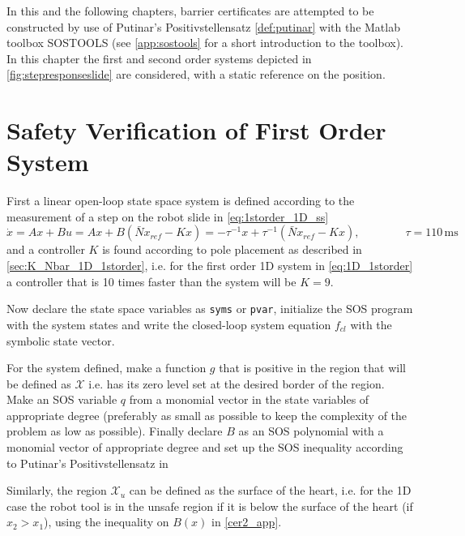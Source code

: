 In this and the following chapters, barrier certificates are attempted to be constructed by use of Putinar's Positivstellensatz \autoref{def:putinar} with the Matlab toolbox SOSTOOLS (see \autoref{app:sostools} for a short introduction to the toolbox). In this chapter the first and second order systems depicted in \autoref{fig:stepresponseslide} are considered, with a static reference on the position.




\section{Safety Verification of First Order System}
First a linear open-loop state space system is defined according to the measurement of a step on the robot slide in \autoref{eq:1storder_1D_ss}
\begin{equation}
\dot{x} = Ax+Bu = Ax+B(\bar{N}x_{ref}-Kx) = %
-\tau^{-1}x+\tau^{-1}(\bar{N}x_{ref}-Kx), \qquad\qquad \tau=110\,\text{ms}
\label{eq:1D_1storder}
\end{equation} 
and a controller $K$ is found according to pole placement as described in \autoref{sec:K_Nbar_1D_1storder}, i.e. for the first order 1D system in \autoref{eq:1D_1storder} a controller that is 10 times faster than the system will be $K=9$.

Now declare the state space variables as \verb|syms| or \verb|pvar|, initialize the SOS program with the system states and write the closed-loop system equation $f_{cl}$ with the symbolic state vector.

For the system defined, make a function $g$ that is positive in the region that will be defined as $\mathcal{X}$ i.e. has its zero level set at the desired border of the region. Make an SOS variable $q$ from a monomial vector in the state variables of appropriate degree (preferably as small as possible to keep the complexity of the problem as low as possible). Finally declare $B$ as an SOS polynomial with a monomial vector of appropriate degree and set up the SOS inequality according to Putinar's Positivstellensatz in



Similarly, the region $\mathcal{X}_u$ can be defined as the surface of the heart, i.e. for the 1D case the robot tool is in the unsafe region if it is below the surface of the heart (if $x_2>x_1$), using the inequality on $B(x)$ in \autoref{cer2_app}.

